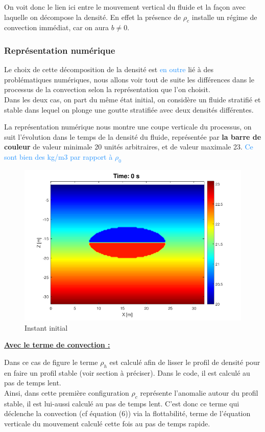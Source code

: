 \documentclass{rapportECC}
\newcommand{\FAadd}[1]{\textcolor{DodgerBlue}{{#1}}}                     %
\begin{document}
On voit donc le lien ici entre le mouvement vertical du fluide et la façon avec laquelle on décompose la densité. En effet la présence de $\rho_c$ installe un régime de convection immédiat, car on aura $b \neq 0$.\\

\subsubsection{Représentation numérique}

Le choix de cette décomposition de la densité est \FAadd{en outre} lié à  des problématiques numériques, nous allons voir tout de suite les différences dans le processus de la convection selon la représentation que l'on choisit. \\
Dans les deux cas, on part du même état initial, on considère un fluide stratifié et stable dans lequel on plonge une goutte stratifiée avec deux densités différentes. 

La représentation numérique nous montre une coupe verticale du processus, on suit l'évolution dans le temps de la densité du fluide, représentée par \textbf{la barre de couleur} de valeur minimale 20 unités arbitraires, et de valeur maximale 23. \FAadd{Ce sont bien des kg/m3 par rapport à $\rho_0$}

\begin{figure}[H]
    \centering
    \includegraphics[width=0.7
    \textwidth]{images/Int_ConvT0.png}
    \caption{Instant initial}
\end{figure}


\vspace{1 cm}
\underline{\textbf{Avec le terme de convection :}}
\vspace{0.5 cm}

Dans ce cas de figure le terme $\rho_h$ est calculé afin de  lisser le profil de densité pour en faire un profil stable (voir section à préciser). Dans le code, il est calculé au pas de temps lent. \\
Ainsi, dans cette première configuration $\rho_c$ représente l'anomalie autour du profil stable, il est lui-aussi calculé au pas de temps lent. C'est donc ce terme qui déclenche la convection (cf équation (6)) via la flottabilité, terme de l'équation verticale du mouvement calculé cette fois au pas de temps rapide. \\
\end{document}
